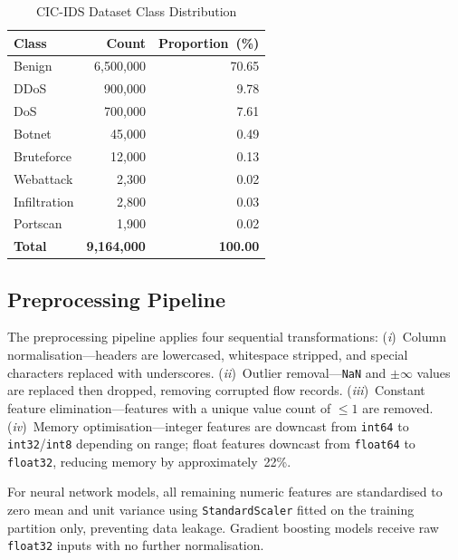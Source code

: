 \documentclass[conference]{IEEEtran}
\begin{document}
\begin{table}[htbp]
  \centering
  \caption{CIC-IDS Dataset Class Distribution}
  \label{tab:classdist}
  \renewcommand{\arraystretch}{1.15}
  \begin{tabular}{lrr}
    \toprule
    \textbf{Class} & \textbf{Count} & \textbf{Proportion~(\%)} \\
    \midrule
    Benign      & 6{,}500{,}000 & 70.65 \\
    DDoS        &   900{,}000   &  9.78 \\
    DoS         &   700{,}000   &  7.61 \\
    Botnet      &    45{,}000   &  0.49 \\
    Bruteforce  &    12{,}000   &  0.13 \\
    Webattack   &     2{,}300   &  0.02 \\
    Infiltration&     2{,}800   &  0.03 \\
    Portscan    &     1{,}900   &  0.02 \\
    \midrule
    \textbf{Total} & \textbf{9{,}164{,}000} & \textbf{100.00} \\
    \bottomrule
  \end{tabular}
\end{table}

\subsection{Preprocessing Pipeline}

The preprocessing pipeline applies four sequential transformations:
(\textit{i})~Column normalisation—headers are lowercased, whitespace stripped,
and special characters replaced with underscores.
(\textit{ii})~Outlier removal—\texttt{NaN} and $\pm\infty$ values are replaced
then dropped, removing corrupted flow records.
(\textit{iii})~Constant feature elimination—features with a unique value count
of $\leq1$ are removed.
(\textit{iv})~Memory optimisation—integer features are downcast from
\texttt{int64} to \texttt{int32}/\texttt{int8} depending on range; float
features downcast from \texttt{float64} to \texttt{float32}, reducing memory
by approximately~22\%.

For neural network models, all remaining numeric features are standardised to
zero mean and unit variance using \texttt{StandardScaler} fitted on the
training partition only, preventing data leakage.  Gradient boosting models
receive raw \texttt{float32} inputs with no further normalisation.
\end{document}
